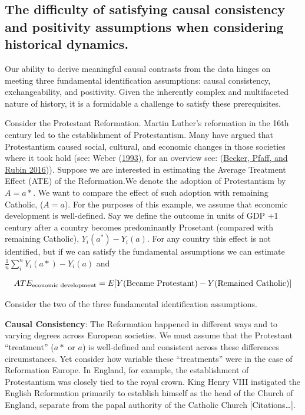 \documentclass[
  singlecolumn]{report}
\begin{document}
\hypertarget{the-difficulty-of-satisfying-causal-consistency-and-positivity-assumptions-when-considering-historical-dynamics.}{%
\subsection{The difficulty of satisfying causal consistency and
positivity assumptions when considering historical
dynamics.}\label{the-difficulty-of-satisfying-causal-consistency-and-positivity-assumptions-when-considering-historical-dynamics.}}

Our ability to derive meaningful causal contrasts from the data hinges
on meeting three fundamental identification assumptions: causal
consistency, exchangeability, and positivity. Given the inherently
complex and multifaceted nature of history, it is a formidable a
challenge to satisfy these prerequisites.

Consider the Protestant Reformation. Martin Luther's reformation in the
16th century led to the establishment of Protestantism. Many have argued
that Protestantism caused social, cultural, and economic changes in
those societies where it took hold (see: Weber
(\protect\hyperlink{ref-weber1993}{1993}), for an overview see:
(\protect\hyperlink{ref-becker2016}{Becker, Pfaff, and Rubin 2016})).
Suppose we are interested in estimating the Average Treatment Effect
(ATE) of the Reformation.We denote the adoption of Protestantism by
\(A = a*\). We want to compare the effect of such adoption with
remaining Catholic, (\(A = a\)). For the purposes of this example, we
assume that economic development is well-defined. Say we define the
outcome in units of GDP +1 century after a country becomes predominantly
Prosetant (compared with remaining Catholic), \(Y_i(a^*) - Y_i(a)\). For
any country this effect is not identified, but if we can satisfy the
fundamental assumptions we can estimate
\(\frac{1}{n} \sum_i^{n} Y_i(a*) - Y_i(a)\) and

\[ATE_{\textnormal{economic~development}} = E[Y(\textnormal{Became~Protestant}) - Y(\textnormal{Remained~Catholic})]\]

Consider the two of the three fundamental identification assumptions.

\textbf{Causal Consistency}: The Reformation happened in different ways
and to varying degrees across European societies. We must assume that
the Protestant ``treatment'' (\(a*\) or \(a\)) is well-defined and
consistent across these differences circumstances. Yet consider how
variable these ``treatments'' were in the case of Reformation Europe. In
England, for example, the establishment of Protestantism was closely
tied to the royal crown. King Henry VIII instigated the English
Reformation primarily to establish himself as the head of the Church of
England, separate from the papal authority of the Catholic Church
{[}Citations\ldots{]}.
\end{document}
